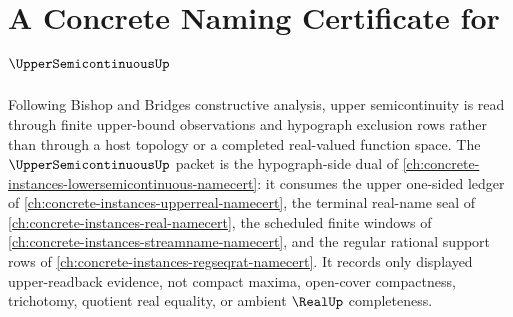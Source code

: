 \chapter{A Concrete Naming Certificate for $\UpperSemicontinuousUp$}
\label{ch:concrete-instances-uppersemicontinuous-namecert}

Following Bishop and Bridges constructive analysis, upper semicontinuity is
read through finite upper-bound observations and hypograph exclusion rows
rather than through a host topology or a completed real-valued function
space. The $\UpperSemicontinuousUp$ packet is the hypograph-side dual of
\autoref{ch:concrete-instances-lowersemicontinuous-namecert}: it consumes
the upper one-sided ledger of \autoref{ch:concrete-instances-upperreal-namecert},
the terminal real-name seal of \autoref{ch:concrete-instances-real-namecert},
the scheduled finite windows of \autoref{ch:concrete-instances-streamname-namecert},
and the regular rational support rows of
\autoref{ch:concrete-instances-regseqrat-namecert}. It records only displayed
upper-readback evidence, not compact maxima, open-cover compactness,
trichotomy, quotient real equality, or ambient $\RealUp$ completeness.

